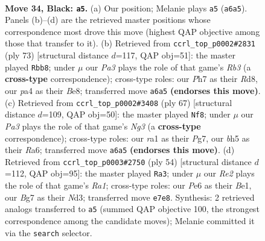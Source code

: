 \documentclass[11pt]{article}
\begin{document}
\clearpage

\begin{figure}[p]\centering
\begin{subfigure}{0.46\textwidth}\centering
\resizebox{\linewidth}{!}{%
\newchessgame
\chessboard[
  setfen={r1b3k1/3pr1bp/pq2p3/5p1B/P1np3P/5NQ1/1P3P2/RNBR1K2 b - - 3 34},
  showmover=false,
  pgfstyle=straightmove, color=movearrow, markmove={a6-a5}
]}
\caption{}
\end{subfigure}\hfill
\begin{subfigure}{0.46\textwidth}\centering
\resizebox{\linewidth}{!}{%
\newchessgame
\chessboard[
  setfen={3rb1k1/q4pp1/1rnb3p/1p2p3/4B3/P3PNPP/1Q3P2/R2RB1K1 b - - 4 37},
  showmover=false,
  pgfstyle=straightmove, color=movearrow, markmove={b6-b8}
]}
\caption{}
\end{subfigure}
\\[4pt]
\begin{subfigure}{0.46\textwidth}\centering
\resizebox{\linewidth}{!}{%
\newchessgame
\chessboard[
  setfen={2r3k1/4qpp1/r2p2np/pNp1b3/P3P3/1P5P/1PR3P1/1K1RBQ2 b - - 9 34},
  showmover=false,
  pgfstyle=straightmove, color=movearrow, markmove={g6-f8}
]}
\caption{}
\end{subfigure}\hfill
\begin{subfigure}{0.46\textwidth}\centering
\resizebox{\linewidth}{!}{%
\newchessgame
\chessboard[
  setfen={4r1k1/pp3rp1/q5n1/P2R1p2/3Pn2P/3NP2Q/5P1P/R3BK2 w - - 1 28},
  showmover=false,
  pgfstyle=straightmove, color=movearrow, markmove={a1-a3}
]}
\caption{}
\end{subfigure}
\caption{\textbf{Move 34, Black: \texttt{a5}.} (a) Our position; Melanie plays \texttt{a5} (\texttt{a6a5}). Panels (b)--(d) are the retrieved master positions whose correspondence most drove this move (highest QAP objective among those that transfer to it). (b) Retrieved from \texttt{ccrl\_top\_p0002\#2831} (ply 73) [structural distance $d$=117, QAP obj=51]: the master played \texttt{Rbb8}; under $\mu$ our \emph{Pa3} plays the role of that game's \emph{Rb3} (a \textbf{cross-type} correspondence); cross-type roles: our \emph{P}h7 as their \emph{R}d8, our \emph{p}a4 as their \emph{B}e8; transferred move \texttt{a6a5} \textbf{(endorses this move)}. (c) Retrieved from \texttt{ccrl\_top\_p0002\#3408} (ply 67) [structural distance $d$=109, QAP obj=50]: the master played \texttt{Nf8}; under $\mu$ our \emph{Pa3} plays the role of that game's \emph{Ng3} (a \textbf{cross-type} correspondence); cross-type roles: our \emph{r}a1 as their \emph{P}g7, our \emph{b}h5 as their \emph{R}a6; transferred move \texttt{a6a5} \textbf{(endorses this move)}. (d) Retrieved from \texttt{ccrl\_top\_p0003\#2750} (ply 54) [structural distance $d$=112, QAP obj=95]: the master played \texttt{Ra3}; under $\mu$ our \emph{Re2} plays the role of that game's \emph{Ra1}; cross-type roles: our \emph{P}e6 as their \emph{B}e1, our \emph{B}g7 as their \emph{N}d3; transferred move \texttt{e7e8}. Synthesis: 2 retrieved analogs transferred to \texttt{a5} (summed QAP objective 100, the strongest correspondence among the candidate moves); Melanie committed it via the \texttt{search} selector.}
\label{fig:thought-m67}
\end{figure}
\end{document}

